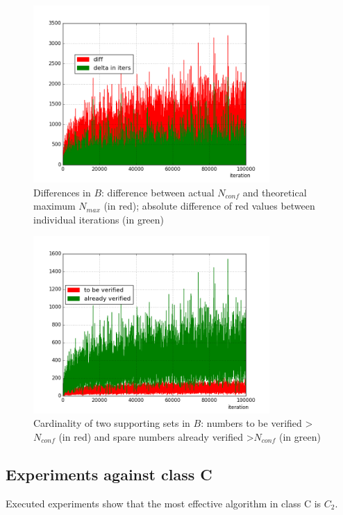 \documentclass[10pt,twocolumn]{article}
\begin{document}
\begin{figure}[!ht]
\centering
\includegraphics[width=9cm]{f_sum_build_diff}
\caption{Differences in $B$: difference between actual $N_{conf}$ and theoretical maximum $N_{max}$ (in red); absolute difference of red values between individual iterations (in green)}
\label{fig:sum_build_diff}
\end{figure}

\begin{figure}[!ht]
\centering
\includegraphics[width=9cm]{f_sum_build_spare_and_to_be_verified}
\caption{Cardinality of two supporting sets in $B$: numbers to be verified \textgreater $N_{conf}$ (in red) and spare numbers already verified \textgreater $N_{conf}$ (in green)}
\label{fig:sum_build_spare_and_to_be_verified}
\end{figure}

\subsection{Experiments against class C}

Executed experiments show that the most effective algorithm in class C is $C_2$.
\end{document}
